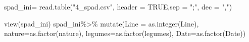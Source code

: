 \documentclass[
]{article}
\newenvironment{Shaded}{\begin{snugshade}}{\end{snugshade}}
\newcommand{\AttributeTok}[1]{\textcolor[rgb]{0.77,0.63,0.00}{#1}}
\newcommand{\ConstantTok}[1]{\textcolor[rgb]{0.00,0.00,0.00}{#1}}
\newcommand{\FunctionTok}[1]{\textcolor[rgb]{0.00,0.00,0.00}{#1}}
\newcommand{\NormalTok}[1]{#1}
\newcommand{\OtherTok}[1]{\textcolor[rgb]{0.56,0.35,0.01}{#1}}
\newcommand{\SpecialCharTok}[1]{\textcolor[rgb]{0.00,0.00,0.00}{#1}}
\newcommand{\StringTok}[1]{\textcolor[rgb]{0.31,0.60,0.02}{#1}}
\begin{document}
\begin{Shaded}
\begin{Highlighting}[]
\NormalTok{spad\_ini}\OtherTok{=} \FunctionTok{read.table}\NormalTok{(}\StringTok{"4\_spad.csv"}\NormalTok{, }\AttributeTok{header =} \ConstantTok{TRUE}\NormalTok{,}\AttributeTok{sep =} \StringTok{";"}\NormalTok{, }\AttributeTok{dec =} \StringTok{","}\NormalTok{)}

\FunctionTok{view}\NormalTok{(spad\_ini)}
\NormalTok{spad\_ini}\SpecialCharTok{\%\textgreater{}\%}
  \FunctionTok{mutate}\NormalTok{(}\AttributeTok{Line =} \FunctionTok{as.integer}\NormalTok{(Line), }\AttributeTok{nature=}\FunctionTok{as.factor}\NormalTok{(nature),}
         \AttributeTok{legumes=}\FunctionTok{as.factor}\NormalTok{(legumes), }\AttributeTok{Date=}\FunctionTok{as.factor}\NormalTok{(Date))}
\end{Highlighting}
\end{Shaded}
\end{document}
